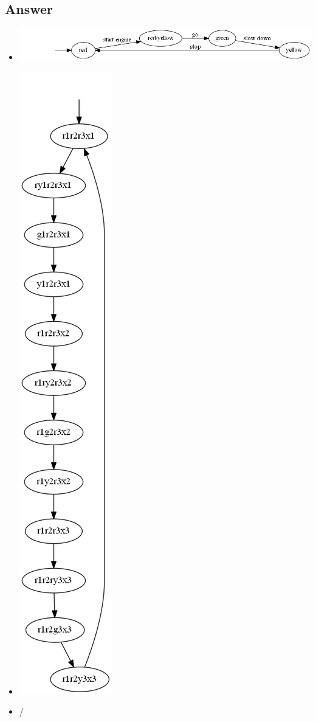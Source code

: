 \documentclass[12pt]{article}
\begin{document}
\newpage
\subsection*{Answer}
\begin{itemize}
	\item \begin{centering}
		\includegraphics*[width=\linewidth]{23a.png}
	\end{centering}
	\item \begin{centering}
		\includegraphics*[scale=0.5]{23b.png}
	\end{centering}
	\item /
\end{itemize}
\end{document}

